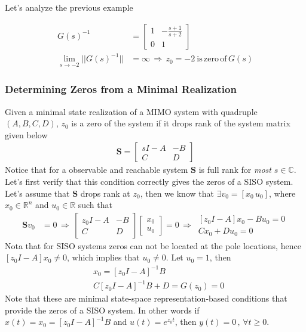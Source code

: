 \documentclass[twoside]{article}
\begin{document}
Let's analyze the previous example 

\begin{align*}
G(s)^{-1} &= \left[ \begin{array}{ccc} 1 & -\frac{s+1}{s+2}  \\  
	0 & 1  \end{array} \right]
	\\
\lim_{s \to -2} || G(s)^{-1} || &= \infty \, \Rightarrow \, z_0 = - 2 \ \mathrm{is} \, \mathrm{zero} \, \mathrm{of} \, G(s)
\end{align*}

\subsubsection{Determining Zeros from a Minimal Realization}

Given a minimal state realization of a MIMO system with quadruple $(A,B,C,D)$, $z_0$ is a zero
of the system if it drops rank of the system matrix given below
%
\begin{align*}
\mathbf{S} = \left[ \begin{array}{cc} s I - A & -B \\ C & D \end{array} \right]
\end{align*}
%
Notice that for a observable and reachable system $\mathbf{S}$ is full rank for \textit{most} $s \in \mathbb{C}$. 
Let's first verify that this condition correctly gives the zeros of a SISO system. Let's assume that 
$\mathbf{S}$ drops rank at $z_0$, then we know that $\exists v_0 = [x_0 \, u_0]$, where $x_0 \in \mathbb{R}^{n}$
and $u_0 \in \mathbb{R}$ such that 
%
\begin{align*}
\mathbf{S} v_0 &= 0
\, \Rightarrow \,
\left[ \begin{array}{cc} z_0 I - A & -B \\ C & D \end{array} \right] \left[ \begin{array}{c} x_0 \\ u_0 \end{array} \right] = 0
\, \Rightarrow \,
 \begin{array}{cc} \left[ z_0 I - A \right] x_0 - B u_0 = 0 \\ C x_0 + D u_0 = 0 \end{array}
\end{align*}
%
Nota that for SISO systems zeros can not be located at the pole locations, hence $ \left[ z_0 I - A \right] x_0 \neq 0$, which implies that $u_0 \neq 0$. Let $u_0 = 1$, then 
%
\begin{align*}
&x_0 =  \left[ z_0 I - A \right]^{-1} B  \\
&C \left[ z_0 I - A \right]^{-1} B  + D = G(z_0) =  0 
\end{align*}
%
Note that these are minimal state-space representation-based conditions that provide the zeros of a SISO system. In other words if $x(t) = x_0 = \left[ z_0 I - A \right]^{-1} B$ and $u(t) = e^{z_0 t}$, then $y(t) = 0 \, , \, \forall t \geq 0$. 
\end{document}
